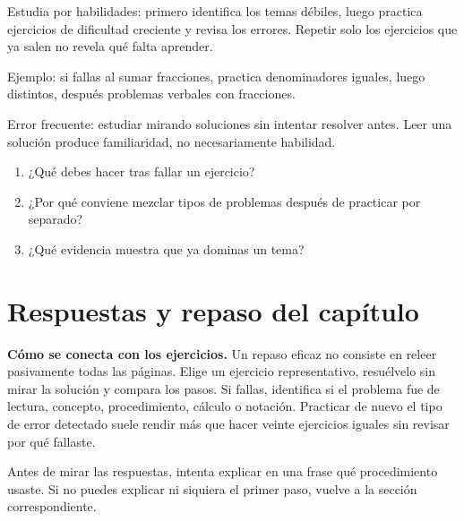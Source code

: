 \documentclass[10pt,oneside,openany]{book}
\begin{document}
Estudia por habilidades: primero identifica los temas débiles, luego practica ejercicios de dificultad creciente y revisa los errores. Repetir solo los ejercicios que ya salen no revela qué falta aprender.

\begin{ejemplo}
Ejemplo: si fallas al sumar fracciones, practica denominadores iguales, luego distintos, después problemas verbales con fracciones.
\end{ejemplo}

\begin{ojo}
Error frecuente: estudiar mirando soluciones sin intentar resolver antes. Leer una solución produce familiaridad, no necesariamente habilidad.
\end{ojo}

\begin{practica}

\begin{enumerate}

\item ¿Qué debes hacer tras fallar un ejercicio?

\item ¿Por qué conviene mezclar tipos de problemas después de practicar por separado?

\item ¿Qué evidencia muestra que ya dominas un tema?

\end{enumerate}

\end{practica}



\section{Respuestas y repaso del capítulo}

\textbf{Cómo se conecta con los ejercicios.} Un repaso eficaz no consiste en releer pasivamente todas las páginas. Elige un ejercicio representativo, resuélvelo sin mirar la solución y compara los pasos. Si fallas, identifica si el problema fue de lectura, concepto, procedimiento, cálculo o notación. Practicar de nuevo el tipo de error detectado suele rendir más que hacer veinte ejercicios iguales sin revisar por qué fallaste.

Antes de mirar las respuestas, intenta explicar en una frase qué procedimiento usaste. Si no puedes explicar ni siquiera el primer paso, vuelve a la sección correspondiente.
\end{document}
